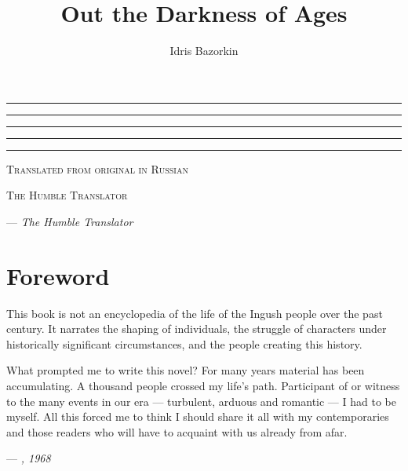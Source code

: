 \documentclass[smalldemyvopaper,11pt,twoside,onecolumn,openright,extrafontsizes]{memoir}
\title{Out the Darkness of Ages}
\author{Idris Bazorkin}
\newcommand{\ISBN}{0-000-00000-2}
\newcommand{\press}{The Humble Translator}
\newcommand{\translation}{Translated from original in Russian}
\newcommand*\halftitlepage{\begingroup %
  \setlength\drop{0.1\textheight}
  \begin{center}

  \vspace*{\drop}
  \rule{\textwidth}{0in}\par
  {\Large\textsc\thetitle\par}
  \rule{\textwidth}{0in}\par
  \vfill
  \end{center}
\endgroup}
\newlength\drop
\newcommand*\titleM{\begingroup %
  \setlength\drop{0.15\textheight}
  \begin{center}
  \vspace*{\drop}
  \rule{\textwidth}{0in}\par
  {\HUGE\textsc\thetitle\par}
  \rule{\textwidth}{0in}\par
  {\Large\textit\theauthor\par}
  \rule{\textwidth}{0in}\par
  {\Large\scshape\translation\par}
  \vfill
  {\Large\scshape\press}
  \end{center}
\endgroup}
\begin{document}
\pagestyle{empty}
\halftitlepage
\cleardoublepage

\titleM

\begin{center}
\itshape{}
\medskip
\begin {flushright}
--- \textit{The Humble Translator}
\end {flushright}

\end{center}

\frontmatter
\pagestyle{mystyle}
\chapter*{Foreword}
This book is not an encyclopedia of the life of the Ingush people over the
past century. It narrates the shaping of individuals, the struggle of characters
under historically significant circumstances, and the people creating this
history.\par What prompted me to write this novel? For many years material has been
accumulating. A thousand people crossed my life’s path. Participant of or witness
to the many events in our era — turbulent, arduous and romantic — I
had to be myself. All this forced me to think I should share it all with my
contemporaries and those readers who will have to acquaint with us already from
afar. 
\medskip
\begin {flushright}
--- \textit{\theauthor, 1968}
\end {flushright}
\end{document}
